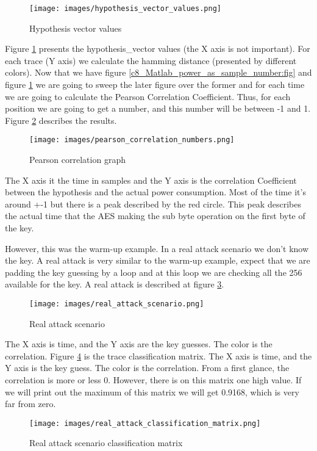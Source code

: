 \begin{figure}[H]
    \centering
    \texttt{[image: images/hypothesis\_vector\_values.png]}
    \caption{Hypothesis vector values} \label{c8_Matlab_hypothesis_vector_values:fig}
\end{figure}


Figure \ref{c8_Matlab_hypothesis_vector_values:fig} presents the hypothesis\_vector values (the X axis is not important). For each trace (Y axis) we calculate the hamming distance (presented by different colors). 
Now that we have figure \ref{c8_Matlab_power_as_sample_number:fig} and figure \ref{c8_Matlab_hypothesis_vector_values:fig} we are going to sweep the later figure over the former and for  each time we are going to calculate the Pearson Correlation Coefficient. Thus, for each position we are going to get a number, and this number will be between -1 and 1. Figure \ref{c8_Matlab_pearson_correlation:fig} describes the results. 
\begin{figure}[H]
    \centering
    \texttt{[image: images/pearson\_correlation\_numbers.png]}
    \caption{Pearson correlation graph} \label{c8_Matlab_pearson_correlation:fig}
\end{figure}
The X axis it the time in samples and the Y axis is the correlation Coefficient between the hypothesis and the actual power consumption. Most of the time it’s around +-1 but there is a peak described by the red circle. This peak describes the actual time that the AES making the sub byte operation on the first byte of the key. 

However, this was the warm-up example. In a real attack scenario we don’t know the key. A real attack is very similar to the warm-up example, expect that we are padding the key guessing by a loop and at this loop we are checking all the 256 available for the key. A real attack is described at figure \ref{c8_Matlab_real_attack_scenario:fig}.
\begin{figure}[H]
    \centering
    \texttt{[image: images/real\_attack\_scenario.png]}
    \caption{Real attack scenario} \label{c8_Matlab_real_attack_scenario:fig}
\end{figure}

The X axis is time, and the Y axis are the key guesses. The color is the correlation. 
Figure \ref{c8_Matlab_classification_matrix:fig} is the trace classification matrix. The X axis is time, and the Y axis is the key guess. The color is the correlation. From a first glance, the correlation is more or less 0. However, there is on this matrix one high value. If we will print out the maximum of this matrix we will get 0.9168, which is very far from zero. 
\begin{figure}[H]
    \centering
    \texttt{[image: images/real\_attack\_classification\_matrix.png]}
    \caption{Real attack scenario classification matrix} \label{c8_Matlab_classification_matrix:fig}
\end{figure}

